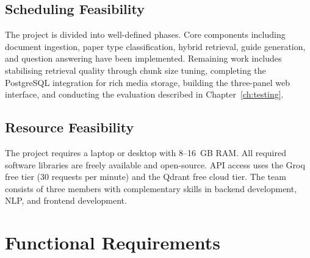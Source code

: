 \documentclass[12pt,a4paper]{report}
\begin{document}
\subsection{Scheduling Feasibility}
The project is divided into well-defined phases. Core components including
document ingestion, paper type classification, hybrid retrieval, guide
generation, and question answering have been implemented. Remaining work
includes stabilising retrieval quality through chunk size tuning, completing the
PostgreSQL integration for rich media storage, building the three-panel web
interface, and conducting the evaluation described in Chapter~\ref{ch:testing}.

\subsection{Resource Feasibility}
The project requires a laptop or desktop with 8--16~GB RAM. All required
software libraries are freely available and open-source. API access uses the
Groq free tier (30 requests per minute) and the Qdrant free cloud tier. The
team consists of three members with complementary skills in backend development,
NLP, and frontend development.

\section{Functional Requirements}
\end{document}
